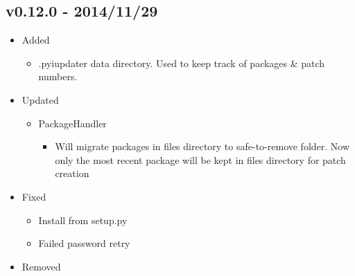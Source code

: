 \documentclass[letterpaper,10pt,english]{sphinxmanual}
\begin{document}
\subsection{v0.12.0 - 2014/11/29}
\label{release_history:v0-12-0-2014-11-29}\begin{itemize}
\item {} 
Added
\begin{itemize}
\item {} 
.pyiupdater data directory. Used to keep track of packages \& patch numbers.

\end{itemize}

\item {} 
Updated
\begin{itemize}
\item {} 
PackageHandler
\begin{itemize}
\item {} 
Will migrate packages in files directory to safe-to-remove folder.
Now only the most recent package will be kept in files directory for patch creation

\end{itemize}

\end{itemize}

\item {} 
Fixed
\begin{itemize}
\item {} 
Install from setup.py

\item {} 
Failed password retry

\end{itemize}

\item {} 
Removed

\end{itemize}
\end{document}
